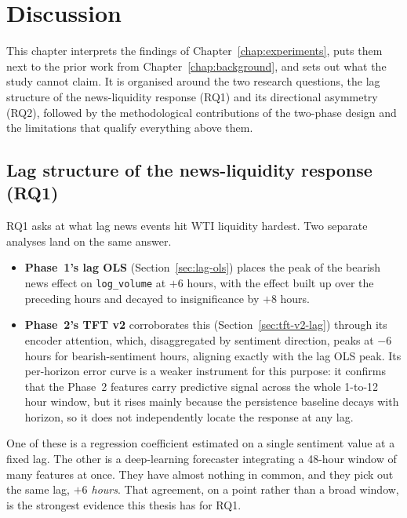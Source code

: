 \chapter{Discussion}\label{chap:discussion}

This chapter interprets the findings of Chapter~\ref{chap:experiments}, puts them next to the prior work from Chapter~\ref{chap:background}, and sets out what the study cannot claim. It is organised around the two research questions, the lag structure of the news-liquidity response (RQ1) and its directional asymmetry (RQ2), followed by the methodological contributions of the two-phase design and the limitations that qualify everything above them.

\section{Lag structure of the news-liquidity response (RQ1)}\label{sec:rq1-discussion}

RQ1 asks at what lag news events hit WTI liquidity hardest. Two separate analyses land on the same answer.

\begin{itemize}
  \item \textbf{Phase~1's lag OLS} (Section~\ref{sec:lag-ols}) places the peak of the bearish news effect on \texttt{log\_volume} at $+6$ hours, with the effect built up over the preceding hours and decayed to insignificance by $+8$ hours.
  \item \textbf{Phase~2's TFT v2} corroborates this (Section~\ref{sec:tft-v2-lag}) through its encoder attention, which, disaggregated by sentiment direction, peaks at $-6$ hours for bearish-sentiment hours, aligning exactly with the lag OLS peak. Its per-horizon error curve is a weaker instrument for this purpose: it confirms that the Phase~2 features carry predictive signal across the whole 1-to-12 hour window, but it rises mainly because the persistence baseline decays with horizon, so it does not independently locate the response at any lag.
\end{itemize}

One of these is a regression coefficient estimated on a single sentiment value at a fixed lag. The other is a deep-learning forecaster integrating a 48-hour window of many features at once. They have almost nothing in common, and they pick out the same lag, \emph{$+6$ hours}. That agreement, on a point rather than a broad window, is the strongest evidence this thesis has for RQ1.

